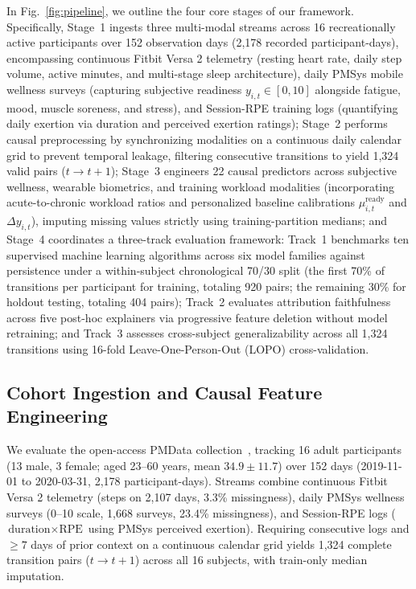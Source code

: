 \documentclass[runningheads]{llncs}
\begin{document}
In Fig.~\ref{fig:pipeline}, we outline the four core stages of our framework. Specifically, Stage~1 ingests three multi-modal streams across 16 recreationally active participants over 152 observation days (2,178 recorded participant-days), encompassing continuous Fitbit Versa 2 telemetry (resting heart rate, daily step volume, active minutes, and multi-stage sleep architecture), daily PMSys mobile wellness surveys (capturing subjective readiness $y_{i,t} \in [0, 10]$ alongside fatigue, mood, muscle soreness, and stress), and Session-RPE training logs (quantifying daily exertion via duration and perceived exertion ratings); Stage~2 performs causal preprocessing by synchronizing modalities on a continuous daily calendar grid to prevent temporal leakage, filtering consecutive transitions to yield 1,324 valid pairs ($t \to t+1$); Stage~3 engineers 22 causal predictors across subjective wellness, wearable biometrics, and training workload modalities (incorporating acute-to-chronic workload ratios and personalized baseline calibrations $\mu_{i,t}^{\text{ready}}$ and $\Delta y_{i,t}$), imputing missing values strictly using training-partition medians; and Stage~4 coordinates a three-track evaluation framework: Track~1 benchmarks ten supervised machine learning algorithms across six model families against persistence under a within-subject chronological 70/30 split (the first 70\% of transitions per participant for training, totaling 920 pairs; the remaining 30\% for holdout testing, totaling 404 pairs); Track~2 evaluates attribution faithfulness across five post-hoc explainers via progressive feature deletion without model retraining; and Track~3 assesses cross-subject generalizability across all 1,324 transitions using 16-fold Leave-One-Person-Out (LOPO) cross-validation.

\subsection{Cohort Ingestion and Causal Feature Engineering}
We evaluate the open-access PMData collection~\cite{thambawita2020pmdata}, tracking 16 adult participants (13 male, 3 female; aged 23--60 years, mean $34.9 \pm 11.7$) over 152 days (2019-11-01 to 2020-03-31, 2,178 participant-days). Streams combine continuous Fitbit Versa 2 telemetry (steps on 2,107 days, 3.3\% missingness), daily PMSys wellness surveys (0--10 scale, 1,668 surveys, 23.4\% missingness), and Session-RPE logs ($\text{duration} \times \text{RPE}$ using PMSys perceived exertion). Requiring consecutive logs and $\geq 7$ days of prior context on a continuous calendar grid yields 1,324 complete transition pairs ($t \to t+1$) across all 16 subjects, with train-only median imputation.
\end{document}
